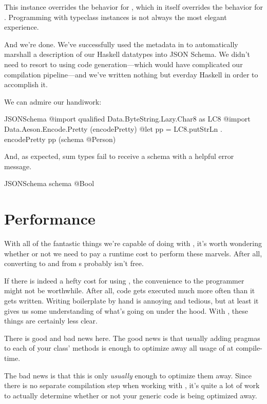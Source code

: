 \documentclass[book.tex]{subfiles}
\begin{document}

This instance overrides the behavior for \ty{[a]}, which in itself overrides the
behavior for . Programming with typeclass instances is not always the
most elegant experience.

And we're done. We've successfully used the metadata in  to
automatically marshall a description of our Haskell datatypes into JSON Schema.
We didn't need to resort to using code generation---which would have complicated
our compilation pipeline---and we've written nothing but everday Haskell in
order to accomplish it.

We can admire our handiwork:

\begin{dorepl}{JSONSchema}
@import qualified Data.ByteString.Lazy.Char8 as LC8
@import Data.Aeson.Encode.Pretty (encodePretty)
@let pp = LC8.putStrLn . encodePretty
pp (schema @Person)
\end{dorepl}

And, as expected, sum types fail to receive a schema with a helpful error
message.

\begin{dorepl}{JSONSchema}
schema @Bool
\end{dorepl}


\section{Performance}

With all of the fantastic things we're capable of doing with ,
it's worth wondering whether or not we need to pay a runtime cost to perform
these marvels. After all, converting to and from s probably isn't free.

If there is indeed a hefty cost for using , the convenience to
the programmer might not be worthwhile. After all, code gets executed much more
often than it gets written. Writing boilerplate by hand is annoying and tedious,
but at least it gives us some understanding of what's going on under the hood.
With , these things are certainly less clear.

There is good and bad news here. The good news is that usually adding
 pragmas to each of your class' methods is enough to optimize away
all usage of  at compile-time.

The bad news is that this is only \emph{usually} enough to optimize them away.
Since there is no separate compilation step when working with ,
it's quite a lot of work to actually determine whether or not your generic code
is being optimized away.
\end{document}

